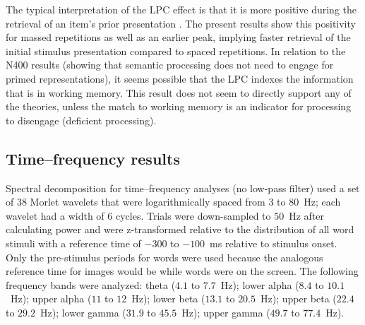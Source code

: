 The typical interpretation of the LPC effect is that it is more positive during the retrieval of an item's prior presentation \cite{OlicEtal2000,VanSEtal2007}.  The present results show this positivity for massed repetitions as well as an earlier peak, implying faster retrieval of the initial stimulus presentation compared to spaced repetitions.
In relation to the N400 results (showing that semantic processing does not need to engage for primed representations), it seems possible that the LPC indexes the information that is in working memory.  This result does not seem to directly support any of the theories, unless the match to working memory is an indicator for processing to disengage (deficient processing).


\subsection{Time--frequency results}

Spectral decomposition for time--frequency analyses (no low-pass filter) used a set of $38$ Morlet wavelets that were logarithmically spaced from $3$ to $80$~Hz; each wavelet had a width of $6$ cycles.  Trials were down-sampled to $50$~Hz after calculating power and were z-transformed relative to the distribution of all word stimuli with a reference time of $-300$ to $-100$~ms relative to stimulus onset.
Only the pre-stimulus periods for words were used because the analogous reference time for images would be while words were on the screen.
The following frequency bands were analyzed: theta ($4.1$ to $7.7$~Hz); lower alpha ($8.4$ to $10.1$~Hz); upper alpha ($11$ to $12$~Hz); lower beta ($13.1$ to $20.5$~Hz); upper beta ($22.4$ to $29.2$~Hz); lower gamma ($31.9$ to $45.5$~Hz); upper gamma ($49.7$ to $77.4$~Hz).


